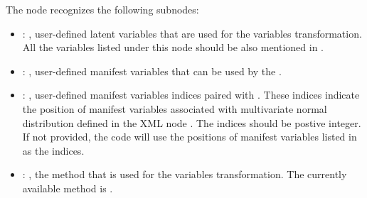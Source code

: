 \begin{itemize}
      The  node recognizes the following subnodes:
      \begin{itemize}
        \item {}: ,
          user-defined latent variables that are used for the variables transformation.
          All the variables listed under this node should be also mentioned in .

        \item {}: ,
          user-defined manifest variables that can be used by the .

        \item {}: ,
          user-defined manifest variables indices paired with .
          These indices indicate the position of manifest variables associated with multivariate
          normal               distribution defined in the XML node .
          The indices should be postive integer. If not provided, the code will use the positions
          of manifest variables listed in  as the indices.

        \item {}: ,
          the method that is used for the variables transformation. The currently available method
          is .
      \end{itemize}
  \end{itemize}

